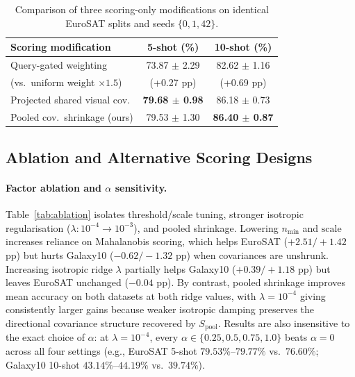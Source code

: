 \documentclass[letterpaper]{article} %
\newcommand{\nmin}{n_{\min}}
\begin{document}
\begin{table}[t]
\centering
\small
\setlength{\tabcolsep}{3.5pt}
\begin{tabular}{@{}lcc@{}}
\toprule
Scoring modification & 5-shot (\%) & 10-shot (\%) \\
\midrule
Query-gated weighting & 73.87 $\pm$ 2.29 & 82.62 $\pm$ 1.16 \\
\quad (vs.\ uniform weight $\times 1.5$) & {\footnotesize (+0.27 pp)} & {\footnotesize (+0.69 pp)} \\
Projected shared visual cov. & \textbf{79.68 $\pm$ 0.98} & 86.18 $\pm$ 0.73 \\
Pooled cov.\ shrinkage (ours) & 79.53 $\pm$ 1.30 & \textbf{86.40 $\pm$ 0.87} \\
\bottomrule
\end{tabular}
\caption{Comparison of three scoring-only modifications on identical EuroSAT splits and seeds $\{0, 1, 42\}$.}
\label{tab:alternatives}
\end{table}

\subsection{Ablation and Alternative Scoring Designs}

\paragraph{Factor ablation and $\alpha$ sensitivity.}
Table~\ref{tab:ablation} isolates threshold/scale tuning, stronger isotropic regularisation ($\lambda: 10^{-4}\to 10^{-3}$), and pooled shrinkage. Lowering $\nmin$ and $\mathrm{scale}$ increases reliance on Mahalanobis scoring, which helps EuroSAT ($+2.51 / +1.42$ pp) but hurts Galaxy10 ($-0.62 / -1.32$ pp) when covariances are unshrunk. Increasing isotropic ridge $\lambda$ partially helps Galaxy10 ($+0.39 / +1.18$ pp) but leaves EuroSAT unchanged ($-0.04$ pp). By contrast, pooled shrinkage improves mean accuracy on both datasets at both ridge values, with $\lambda = 10^{-4}$ giving consistently larger gains because weaker isotropic damping preserves the directional covariance structure recovered by $S_{\mathrm{pool}}$. Results are also insensitive to the exact choice of $\alpha$: at $\lambda = 10^{-4}$, every $\alpha \in \{0.25, 0.5, 0.75, 1.0\}$ beats $\alpha = 0$ across all four settings (e.g., EuroSAT 5-shot $79.53\%$--$79.77\%$ vs.\ $76.60\%$; Galaxy10 10-shot $43.14\%$--$44.19\%$ vs.\ $39.74\%$).
\end{document}
